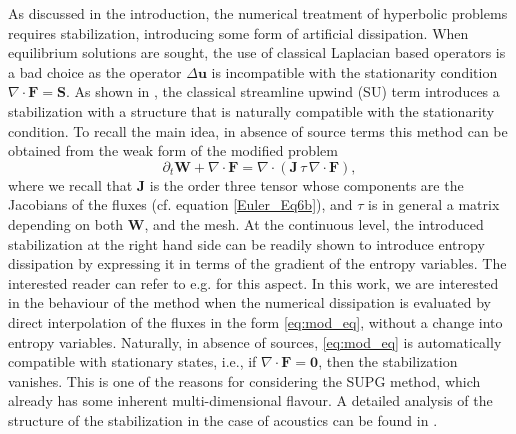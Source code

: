 \documentclass[a4paper,10pt]{article}
\begin{document}
As discussed in the introduction, the numerical treatment  of hyperbolic problems requires stabilization,
introducing   some form of artificial dissipation. 
When equilibrium solutions are sought, the use of classical Laplacian based operators
is a bad choice as the operator $\Delta\mathbf{u}$  is incompatible with the stationarity condition  $\nabla\cdot\mathbf{F}=\mathbf{S}$.
As shown in \cite{barsukow2025structure}, the classical streamline upwind (SU) term  \cite{brooks82,hughes86}   introduces
a stabilization with a structure that is naturally compatible with the stationarity condition. To recall the main idea, in absence of source terms
this method can be obtained from  the  weak form of the modified problem
\begin{equation}\label{eq:mod_eq}
\partial_t\mathbf{W} + \nabla\cdot\mathbf{F} =  \nabla\cdot\left( \mathbf{J} \,\tau\,  \nabla\cdot\mathbf{F}  \right),
\end{equation}
where we recall that  $\mathbf{J}$ is the order three tensor whose components are the Jacobians  of the fluxes (cf. equation \eqref{Euler_Eq6b}), 
and $\tau$ is in general a matrix depending on both $\mathbf{W}$, and the mesh. At the continuous level, the introduced stabilization
at the right hand side can be  readily shown to introduce entropy dissipation by expressing it in terms of the gradient of the entropy variables.
The interested reader can refer to e.g. \cite{hfm86,Barth98} for this aspect. 
In this work, we are interested in the behaviour of the method
when the numerical dissipation is evaluated by direct interpolation of the fluxes in the form \eqref{eq:mod_eq}, without a change into entropy variables. 
Naturally, in absence of sources, \eqref{eq:mod_eq} is automatically compatible with stationary states, i.e., if $\nabla\cdot\mathbf{F} = \mathbf{0}$, then the stabilization vanishes.
This is one of the reasons for considering the SUPG method, which already has some inherent multi-dimensional flavour.
A detailed analysis of the structure of the stabilization in the case of acoustics can be found in \cite{barsukow2025structure}. 
\end{document}
